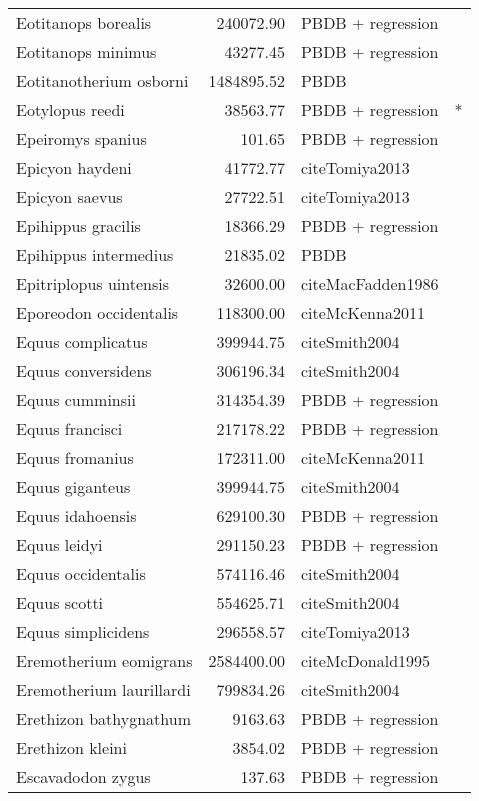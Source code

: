 \begin{table}[ht]
\begin{tabular}{lrll}
  Eotitanops borealis & 240072.90 & PBDB + regression &  \\ 
  Eotitanops minimus & 43277.45 & PBDB + regression &  \\ 
  Eotitanotherium osborni & 1484895.52 & PBDB &  \\ 
  Eotylopus reedi & 38563.77 & PBDB + regression & * \\ 
  Epeiromys spanius & 101.65 & PBDB + regression &  \\ 
  Epicyon haydeni & 41772.77 & cite{Tomiya2013} &  \\ 
  Epicyon saevus & 27722.51 & cite{Tomiya2013} &  \\ 
  Epihippus gracilis & 18366.29 & PBDB + regression &  \\ 
  Epihippus intermedius & 21835.02 & PBDB &  \\ 
  Epitriplopus uintensis & 32600.00 & cite{MacFadden1986} &  \\ 
  Eporeodon occidentalis & 118300.00 & cite{McKenna2011} &  \\ 
  Equus complicatus & 399944.75 & cite{Smith2004} &  \\ 
  Equus conversidens & 306196.34 & cite{Smith2004} &  \\ 
  Equus cumminsii & 314354.39 & PBDB + regression &  \\ 
  Equus francisci & 217178.22 & PBDB + regression &  \\ 
  Equus fromanius & 172311.00 & cite{McKenna2011} &  \\ 
  Equus giganteus & 399944.75 & cite{Smith2004} &  \\ 
  Equus idahoensis & 629100.30 & PBDB + regression &  \\ 
  Equus leidyi & 291150.23 & PBDB + regression &  \\ 
  Equus occidentalis & 574116.46 & cite{Smith2004} &  \\ 
  Equus scotti & 554625.71 & cite{Smith2004} &  \\ 
  Equus simplicidens & 296558.57 & cite{Tomiya2013} &  \\ 
  Eremotherium eomigrans & 2584400.00 & cite{McDonald1995} &  \\ 
  Eremotherium laurillardi & 799834.26 & cite{Smith2004} &  \\ 
  Erethizon bathygnathum & 9163.63 & PBDB + regression &  \\ 
  Erethizon kleini & 3854.02 & PBDB + regression &  \\ 
  Escavadodon zygus & 137.63 & PBDB + regression &  \\ 

\end{tabular}
\end{table}
